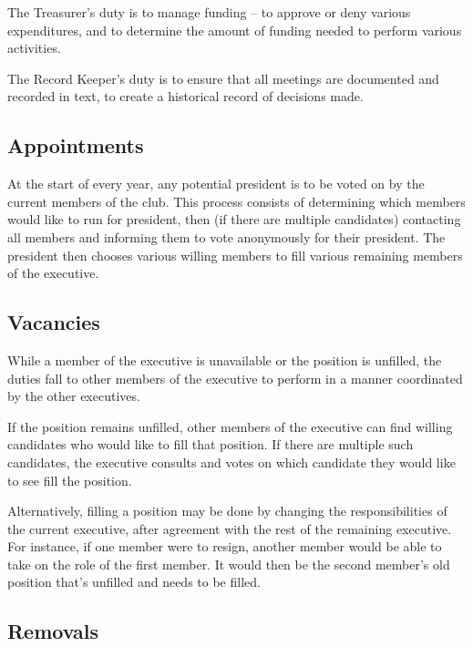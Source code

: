 \documentclass[11pt]{article}
\begin{document}
\vspace{2mm}
\noindent
The Treasurer's duty is to manage funding -- to approve or deny various expenditures, and to determine the amount of funding needed to perform various activities.

\vspace{2mm}
\noindent
The Record Keeper's duty is to ensure that all meetings are documented and recorded in text, to create a historical record of decisions made.

\subsection{Appointments}

At the start of every year, any potential president is to be voted on by the current members of the club. This process consists of determining which members would like to run for president, then (if there are multiple candidates) contacting all members and informing them to vote anonymously for their president. The president then chooses various willing members to fill various remaining members of the executive.

\subsection{Vacancies}

While a member of the executive is unavailable or the position is unfilled, the duties fall to other members of the executive to perform in a manner coordinated by the other executives.

\vspace{2mm}
\noindent
If the position remains unfilled, other members of the executive can find willing candidates who would like to fill that position. If there are multiple such candidates, the executive consults and votes on which candidate they would like to see fill the position.

\vspace{2mm}
\noindent
Alternatively, filling a position may be done by changing the responsibilities of the current executive, after agreement with the rest of the remaining executive. For instance, if one member were to resign, another member would be able to take on the role of the first member. It would then be the second member's old position that's unfilled and needs to be filled.

\subsection{Removals}
\end{document}
